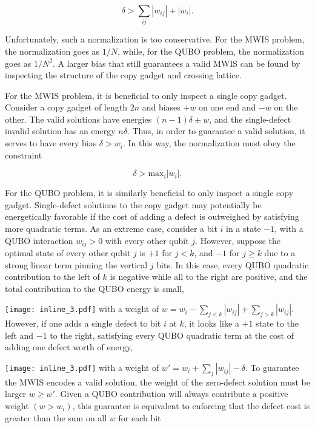 \begin{equation}
    \delta > \sum_{ij}|w_{ij}| + |w_i|.
\end{equation}

Unfortunately, such a normalization is too conservative. For the MWIS problem, the normalization goes as $1/N$, while, for the QUBO problem, the normalization goes as $1/N^2$. A larger bias that still guarantees a valid MWIS can be found by inspecting the structure of the copy gadget and crossing lattice.

For the MWIS problem, it is beneficial to only inspect a single copy gadget. Consider a copy gadget of length $2n$ and biases $+w$ on one end and $-w$ on the other. The valid solutions have energies $(n-1)\delta \pm w$, and the single-defect invalid solution has an energy $n\delta$. Thus, in order to guarantee a valid solution, it serves to have every bias $\delta>w_i$. In this way, the normalization must obey the constraint

\begin{equation}\label{eq:linear_guarantees}
    \delta>\text{max}_i |w_i|.
\end{equation}

For the QUBO problem, it is similarly beneficial to only inspect a single copy gadget. Single-defect solutions to the copy gadget may potentially be energetically favorable if the cost of adding a defect is outweighed by satisfying more quadratic terms. As an extreme case, consider a bit $i$ in a state $-1$, with a QUBO interaction $w_{ij}>0$ with every other qubit $j$. However, suppose the optimal state of every other qubit $j$ is $+1$ for $j<k$, and $-1$ for $j\geq k$ due to a strong linear term pinning the vertical $j$ bits. In this case, every QUBO quadratic contribution to the left of $k$ is negative while all to the right are positive, and the total contribution to the QUBO energy is small,

\texttt{[image: inline\_3.pdf]}
with a weight of $w=w_i - \sum_{j<k}|w_{ij}| + \sum_{j>k}|w_{ij}|$. However, if one adds a single defect to bit $i$ at $k$, it looks like a $+1$ state to the left and $-1$ to the right, satisfying every QUBO quadratic term at the cost of adding one defect worth of energy,

\texttt{[image: inline\_3.pdf]}
with a weight of $w' = w_i + \sum_{j}|w_{ij}| - \delta$.
To guarantee the MWIS encodes a valid solution, the weight of the zero-defect solution must be larger $w\geq w'$. Given a QUBO contribution will always contribute a positive weight $(w>w_i)$, this guarantee is equivalent to enforcing that the defect cost is greater than the sum on all $w$ for each bit

